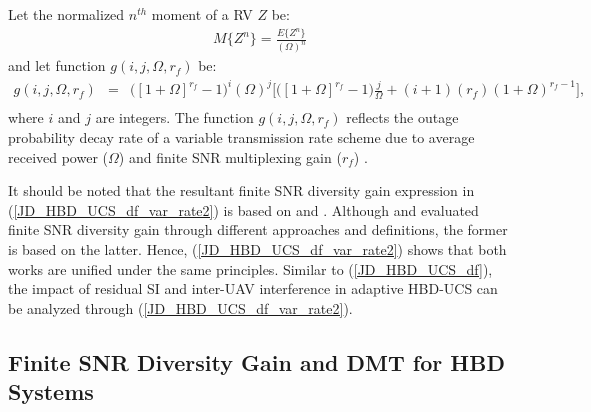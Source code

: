 Let the normalized $n^{th}$ moment of a RV $Z$ be:
\begin{eqnarray} \label{JD_HBD_UCS_norm_moment}
M\{Z^{n}\}=\frac{E\{Z^{n}\}}{(\Omega)^{n}}
\end{eqnarray}
and let function $g(i,j,\Omega,r_f)$ be:
\begin{eqnarray} \label{JD_HBD_UCS_g_func}
g(i,j,\Omega,r_f) & = & \big([1 + \Omega]^{r_f}-1\big)^{i} (\Omega)^{j} \Big[ \big([1 + \Omega]^{r_f} - 1\big) \frac{j}{\Omega} + (i+1)(r_f)(1 + \Omega)^{r_f-1} \Big], \nonumber \\
\end{eqnarray}
where $i$ and $j$ are integers. The function $g(i,j,\Omega,r_f)$ reflects the outage probability decay rate of a variable transmission rate scheme due to average received power ($\Omega$) and finite SNR multiplexing gain ($r_f$) \cite{ernest2019outage}.

It should be noted that the resultant finite SNR diversity gain expression in (\ref{JD_HBD_UCS_df_var_rate2}) is based on \cite[eq. (36)]{shin2008diversity} and \cite[eq. (5)]{narasimhan2006finite}. Although \cite[eq. (36)]{shin2008diversity} and \cite[eq. (5)]{narasimhan2006finite} evaluated finite SNR diversity gain through different approaches and definitions, the former is based on the latter. Hence, (\ref{JD_HBD_UCS_df_var_rate2}) shows that both works are unified under the same principles. Similar to (\ref{JD_HBD_UCS_df}), the impact of residual SI and inter-UAV interference in adaptive HBD-UCS can be analyzed through (\ref{JD_HBD_UCS_df_var_rate2}).

\subsection{Finite SNR Diversity Gain and DMT for HBD Systems}

